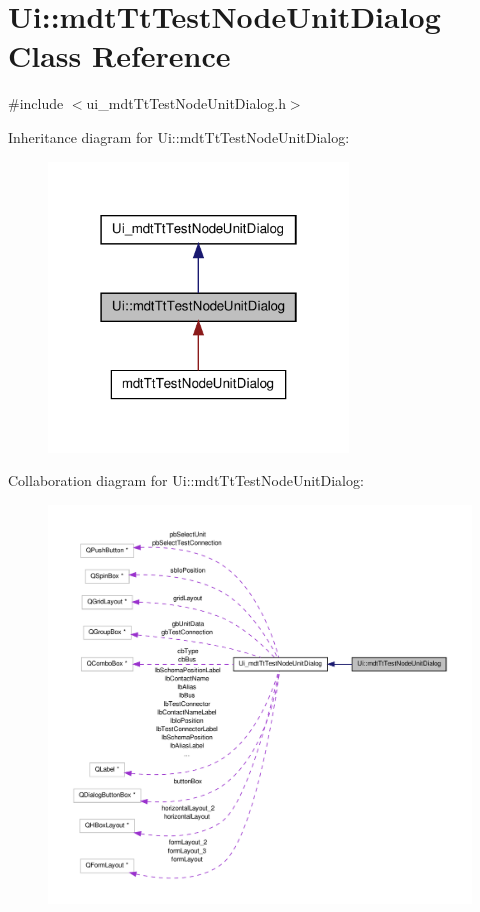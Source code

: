 \hypertarget{class_ui_1_1mdt_tt_test_node_unit_dialog}{\section{Ui\-:\-:mdt\-Tt\-Test\-Node\-Unit\-Dialog Class Reference}
\label{class_ui_1_1mdt_tt_test_node_unit_dialog}
}


{\ttfamily \#include $<$ui\-\_\-mdt\-Tt\-Test\-Node\-Unit\-Dialog.\-h$>$}



Inheritance diagram for Ui\-:\-:mdt\-Tt\-Test\-Node\-Unit\-Dialog\-:
\nopagebreak
\begin{figure}[H]
\begin{center}
\leavevmode
\includegraphics[width=226pt]{class_ui_1_1mdt_tt_test_node_unit_dialog__inherit__graph}
\end{center}
\end{figure}


Collaboration diagram for Ui\-:\-:mdt\-Tt\-Test\-Node\-Unit\-Dialog\-:
\nopagebreak
\begin{figure}[H]
\begin{center}
\leavevmode
\includegraphics[width=350pt]{class_ui_1_1mdt_tt_test_node_unit_dialog__coll__graph}
\end{center}
\end{figure}
